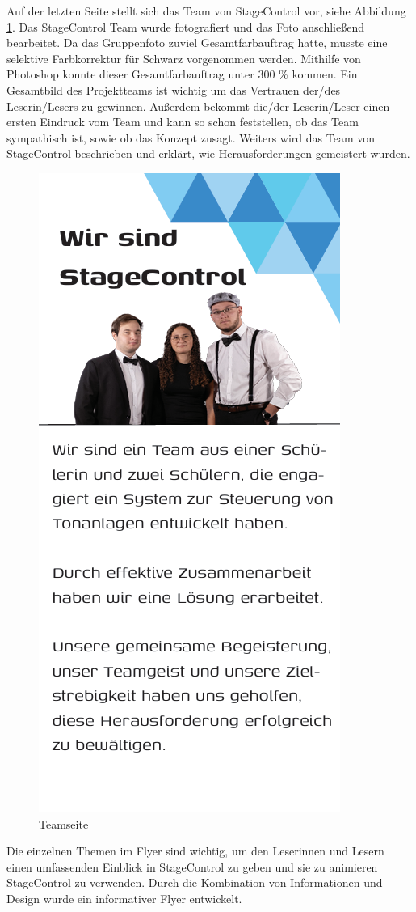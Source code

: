 \newpage
Auf der letzten Seite stellt sich das Team von StageControl vor, siehe Abbildung \ref{fig:Teamseite}. Das StageControl Team wurde fotografiert und das Foto anschließend bearbeitet. Da das Gruppenfoto zuviel Gesamtfarbauftrag hatte, musste eine selektive Farbkorrektur für Schwarz vorgenommen werden. Mithilfe von Photoshop konnte dieser Gesamtfarbauftrag unter 300 \% kommen. Ein Gesamtbild des Projektteams ist wichtig um das Vertrauen der/des Leserin/Lesers zu gewinnen. Außerdem bekommt die/der Leserin/Leser einen ersten Eindruck vom Team und kann so schon feststellen, ob das Team sympathisch ist, sowie ob das Konzept zusagt. Weiters wird das Team von StageControl beschrieben und erklärt, wie Herausforderungen gemeistert wurden.

\begin{figure}[H]
	\centering
	\includegraphics[width=0.5\linewidth]{images/Teamseite.png}
	\caption[Teamseite]{Teamseite}
	\label{fig:Teamseite}
\end{figure} 

Die einzelnen Themen im Flyer sind wichtig, um den Leserinnen und Lesern einen umfassenden Einblick in StageControl zu geben und sie zu animieren StageControl zu verwenden. Durch die Kombination von Informationen und Design wurde ein informativer Flyer entwickelt. 

